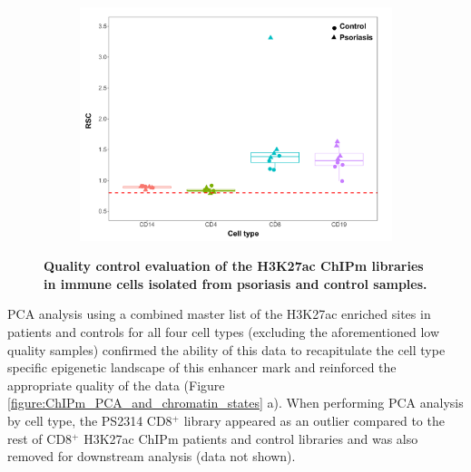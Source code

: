 \begin{figure}[htbp]
\begin{subfigure}{0.5\textwidth}
\centering
\includegraphics[width=\textwidth]{./Results2/pdfs/ChIPm_PS_CTL_RSC_boxplot}
\caption{\textbf{}}
\end{subfigure}
\caption[Quality control evaluation of the H3K27ac ChIPm libraries in immune cells isolated from psoriasis and control samples.]{\textbf{Quality control evaluation of the H3K27ac ChIPm libraries in immune cells isolated from psoriasis and control samples.}}
\label{figure:ChIPm_PS_CTL_QC}
\end{figure} 

PCA analysis using a combined master list of the H3K27ac enriched sites in patients and controls for all four cell types (excluding the aforementioned low quality samples) confirmed the ability of this data to recapitulate the cell type specific epigenetic landscape of this enhancer mark and reinforced the appropriate quality of the data (Figure \ref{figure:ChIPm_PCA_and_chromatin_states} a). When performing PCA analysis by cell type, the PS2314 CD8$^+$ library appeared as an outlier compared to the rest of CD8$^+$ H3K27ac ChIPm patients and control libraries and was also removed for downstream analysis (data not shown). 

